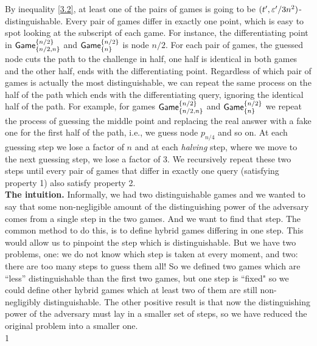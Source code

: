 \documentclass{article}
\newcommand{\game}{{\sf Game}}
\newcommand{\dgb}[2]{\game_{\cub{#1}}^{\cub{#2}}}
\def\vaa{0}
\begin{document}
By inequality \ref{3.2}, at least one of the pairs of games is going to be $(t',\varepsilon'/3n^2)$-distinguishable. Every pair of games differ in exactly one point, which is easy to spot looking at the subscript of each game. For instance, the differentiating point in $\dgb{n/2,n}{n/2}$ and $\dgb{n}{n/2}$ is node $n/2$. For each pair of games, the guessed node cuts the path to the challenge in half, one half is identical in both games and the other half, ends with the differentiating point. Regardless of which pair of games is actually the most distinguishable, we can repeat the same process on the half of the path which ends with the differentiating query, ignoring the identical half of the path. For example, for games $\dgb{n/2,n}{n/2}$ and $\dgb{n}{n/2}$ we repeat the process of guessing the middle point and replacing the real answer with a fake one for the first half of the path, i.e., we guess node $p_{n/4}$ and so on. At each guessing step we lose a factor of $n$ and at each \textit{halving} step, where we move to the next guessing step, we lose a factor of $3$. We recursively repeat these two steps until every pair of games that differ in exactly one query (satisfying property 1) also satisfy property 2. \\

\noindent \textbf{The intuition.} Informally, we had two distinguishable games and we wanted to say that some non-negligible amount of the distinguishing power of the adversary comes from a single step in the two games. And we want to find that step. The common method to do this, is to define hybrid games differing in one step. This would allow us to pinpoint the step which is distinguishable. But we have two problems, one: we do not know which step is taken at every moment, and two: there are too many steps to guess them all! So we defined two games which are ``less'' distinguishable than the first two games, but one step is ``fixed" so we could define other hybrid games which at least two of them are still non-negligibly distinguishable. The other positive result is that now the distinguishing power of the adversary must lay in a smaller set of steps, so we have reduced the original problem into a smaller one. \\
\if\vaa1
\end{document}
